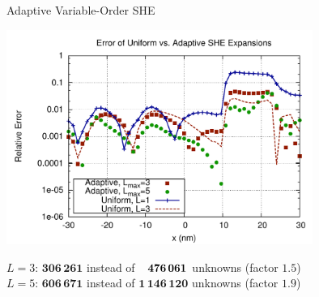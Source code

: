 \documentclass[usepdftitle=false,10pt]{beamer}
\begin{document}
\begin{frame}{Adaptive Variable-Order SHE}
  \vspace{-0.3cm}
  \begin{center}
   \includegraphics[width=0.75\textwidth]{mosfet-energy-error}
  \end{center}
  \vspace{-0.4cm}
  \begin{center}
      $L=3$: $\mathbf{306\, 261}$ instead of $\mathbf{\hphantom{1}\, 476\, 061}$ unknowns (factor $\mathbf{1.5}$) \\
      $L=5$: $\mathbf{606\, 671}$ instead of $\mathbf{1\, 146\, 120}$ unknowns (factor $\mathbf{1.9}$)
  \end{center}
   
\end{frame}

\end{document}
